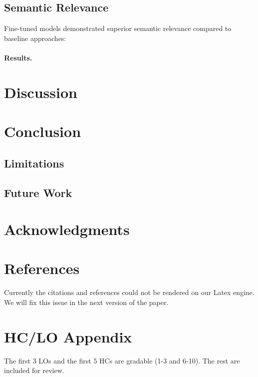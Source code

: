 \documentclass{article}
\newcounter{para}
\begin{document}
\subsection{Semantic Relevance} \label{sec:relevance-results}
Fine-tuned models demonstrated superior semantic relevance compared to baseline approaches:


\paragraph{Results.}

\section{Discussion}
\section{Conclusion}
\subsection{Limitations}
\subsection{Future Work}

\section*{Acknowledgments}
\section*{References}
%
%
Currently the citations and references could not be rendered on our Latex engine. We will fix this issue in the next version of the paper.

\clearpage

\appendix


\section{HC/LO Appendix}
\label{sec:hclo}

The first 3 LOs and the first 5 HCs are gradable (1-3 and 6-10). The rest are included for review.
\end{document}
